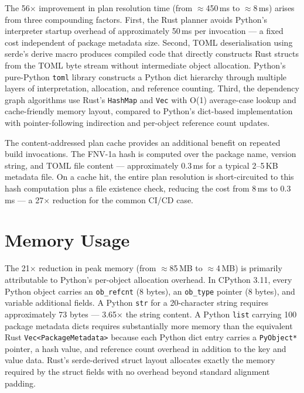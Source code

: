 \documentclass[12pt,a4paper]{report}
\begin{document}
The 56$\times$ improvement in plan resolution time (from $\approx$450\,ms to
$\approx$8\,ms) arises from three compounding factors. First, the Rust planner
avoids Python's interpreter startup overhead of approximately 50\,ms per
invocation --- a fixed cost independent of package metadata size. Second, TOML
deserialisation using serde's derive macro produces compiled code that directly
constructs Rust structs from the TOML byte stream without intermediate object
allocation. Python's pure-Python \texttt{toml} library constructs a Python dict
hierarchy through multiple layers of interpretation, allocation, and reference
counting. Third, the dependency graph algorithms use Rust's \texttt{HashMap} and
\texttt{Vec} with O(1) average-case lookup and cache-friendly memory layout,
compared to Python's dict-based implementation with pointer-following indirection
and per-object reference count updates.

The content-addressed plan cache provides an additional benefit on repeated build
invocations. The FNV-1a hash is computed over the package name, version string,
and TOML file content --- approximately 0.3\,ms for a typical 2--5\,KB metadata
file. On a cache hit, the entire plan resolution is short-circuited to this hash
computation plus a file existence check, reducing the cost from 8\,ms to
0.3\,ms --- a 27$\times$ reduction for the common CI/CD case.

\section{Memory Usage}

The 21$\times$ reduction in peak memory (from $\approx$85\,MB to $\approx$4\,MB)
is primarily attributable to Python's per-object allocation overhead. In CPython
3.11, every Python object carries an \texttt{ob\_refcnt} (8 bytes), an
\texttt{ob\_type} pointer (8 bytes), and variable additional fields. A Python
\texttt{str} for a 20-character string requires approximately 73 bytes ---
3.65$\times$ the string content. A Python \texttt{list} carrying 100 package
metadata dicts requires substantially more memory than the equivalent Rust
\texttt{Vec<PackageMetadata>} because each Python dict entry carries a
\texttt{PyObject*} pointer, a hash value, and reference count overhead in addition
to the key and value data. Rust's serde-derived struct layout allocates exactly the
memory required by the struct fields with no overhead beyond standard alignment
padding.
\end{document}
